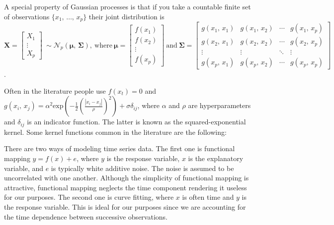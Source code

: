 \documentclass[a4paper, 10pt]{article}
\begin{document}
\begin{flushleft}
   A special property of Gaussian processes is that if you take a countable finite set of observations $\{x_{1}, \, \ldots, \, x_{p}\}$ their joint distribution is 
   $
   \mathbf{X} =
   \begin{bmatrix}
      X_{1} \\
      \vdots \\
      X_{p}
   \end{bmatrix}
   \:
   \sim \mathcal{N}_{p}(\boldsymbol{\mu}, \, \boldsymbol{\Sigma}),
   \:
   \text{where}
   \:
   \boldsymbol{\mu} = 
   \begin{bmatrix}
      f(x_{1}) \\
      f(x_{2}) \\
      \vdots \\
      f(x_{p})
   \end{bmatrix}  
   \: 
   \text{and}
   \:
   \boldsymbol{\Sigma} = 
   \begin{bmatrix}
      g(x_{1}, \, x_{1}) & g(x_{1}, \, x_{2}) & \cdots & g(x_{1}, \, x_{p}) \\
      g(x_{2}, \, x_{1}) & g(x_{2}, \, x_{2}) & \cdots & g(x_{2}, \, x_{p}) \\
      \vdots & \vdots & \ddots & \vdots \\
      g(x_{p}, \, x_{1}) & g(x_{p}, \, x_{2}) & \cdots & g(x_{p}, \, x_{p})
   \end{bmatrix}$.

   \vspace{1em}
   
   Often in the literature people use $f(x_{t}) = 0$ and $g(x_{i}, \, x_{j}) = \alpha^{2} \text{exp}(- \frac{1}{2} (\frac{|x_i - x_j|}{\rho})^2) + \sigma\delta_{ij}$, where $\alpha$ and $\rho$ are hyperparameters and $\delta_{ij}$ is an indicator function. The latter is known as the squared-exponential kernel. Some kernel functions common in the literature are the following:

   \vspace{1em}
   
   There are two ways of modeling time series data. The first one is functional mapping $y = f(x) + e$, where $y$ is the response variable, $x$ is the explanatory variable, and $e$ is typically white additive noise. The noise is assumed to be uncorrelated with one another. Although the simplicity of functional mapping is attractive, functional mapping neglects the time component rendering it useless for our purposes. The second one is curve fitting, where $x$ is often time and $y$ is the response variable. This is ideal for our purposes since we are accounting for the time dependence between successive observations.


\end{flushleft}
\end{document}
